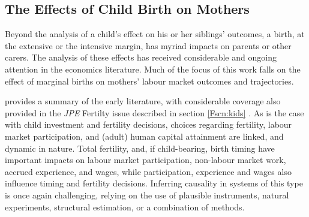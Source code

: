 \documentclass{article}
\begin{document}
\begin{spacing}{1.4}

\section{The Effects of Child Birth on Mothers}
\label{Fscn:mothers}
Beyond the analysis of a child's effect on his or her siblings' outcomes, a
birth, at the extensive or the intensive margin, has myriad impacts on parents
or other carers.  The analysis of these effects has received considerable and 
ongoing attention in the economics literature.  Much of the focus of this work
falls on the effect of marginal births on mothers' labour market outcomes and
trajectories.

\citet{FleisherRhodes1979} provides a summary of the early literature, with 
considerable coverage also provided in the \emph{JPE} Fertilty issue described
in section \ref{Fscn:kids} \citep{Willis1973,Gronau1973}.  As is the case with
child investment and fertility decisions, choices regarding fertility, labour
market participation, and (adult) human capital attainment are linked, and 
dynamic in nature.  Total fertility, and, if child-bearing, birth timing have
important impacts on labour market participation, non-labour market work, 
accrued experience, and wages, while participation, experience and wages also 
influence timing and fertility decisions. Inferring causality in systems of this 
type is once again challenging, relying on the use of plausible instruments, 
natural experiments, structural estimation, or a combination of methods.


\end{spacing}
\end{document}
